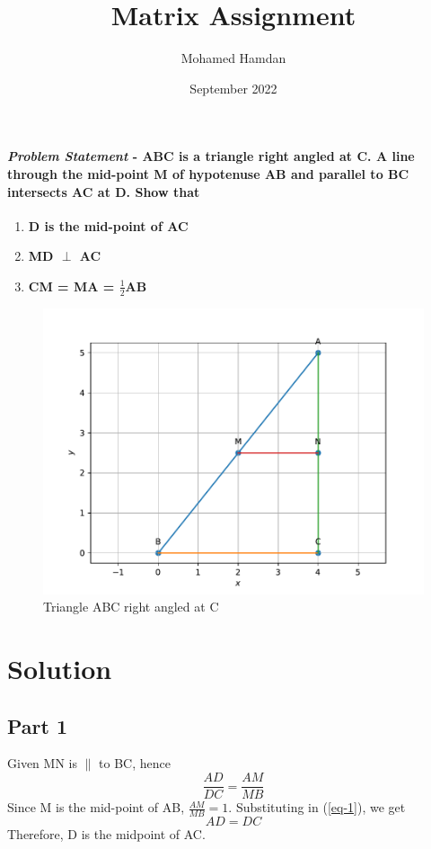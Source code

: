 \documentclass[journal,10pt,twocolumn]{article}
\title{\textbf{Matrix Assignment}}
\author{Mohamed Hamdan}
\date{September 2022}
\begin{document}
\maketitle
\paragraph{\textit{Problem Statement} - ABC is a triangle right angled at C. A line through the mid-point M of hypotenuse AB and parallel to BC intersects AC at D. Show that}
\begin{enumerate}
	\item \textbf{D is the mid-point of AC}
	\item \textbf{MD $\perp$ AC}
	\item \textbf{CM = MA = $\frac{1}{2}$AB}
\end{enumerate}

\begin{figure}[h]
\centering
\includegraphics[width=1\columnwidth]{figs/fig1.pdf}
\caption{Triangle ABC right angled at C}
\label{fig:triangle}
\end{figure}

\section*{Solution}

\subsection*{Part 1}
Given MN is $\parallel$ to BC, hence\\
\begin{equation}
\frac{AD}{DC} = \frac{AM}{MB}
\label{eq-1}
\end{equation}
Since M is the mid-point of AB, $\frac{AM}{MB} = 1$. Substituting in (\ref{eq-1}), we get\\
\begin{equation}
AD = DC
\label{eq-2}
\end{equation}
Therefore, D is the midpoint of AC.
\end{document}
